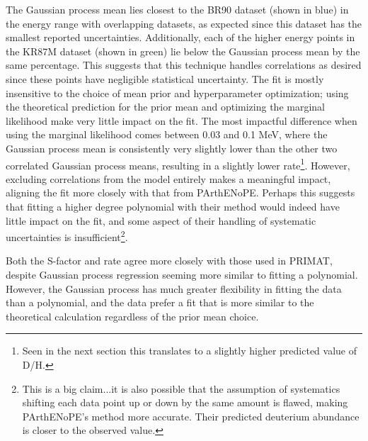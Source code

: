 \documentclass[%
 reprint,
superscriptaddress,
nofootinbib,
 amsmath,amssymb,
 aps,
 pra,
]{revtex4-2}
\begin{document}
The Gaussian process mean lies closest to the BR90 dataset \cite{Brown1990} (shown in blue) in the energy range with overlapping datasets, as expected since this dataset has the smallest reported uncertainties. Additionally, each of the higher energy points in the KR87M dataset \cite{Krauss1987} (shown in green) lie below the Gaussian process mean by the same percentage. This suggests that this technique handles correlations as desired since these points have negligible statistical uncertainty. The fit is mostly insensitive to the choice of mean prior and hyperparameter optimization; using the theoretical prediction for the prior mean and optimizing the marginal likelihood make very little impact on the fit. The most impactful difference when using the marginal likelihood comes between 0.03 and 0.1 MeV, where the Gaussian process mean is consistently very slightly lower than the other two correlated Gaussian process means, resulting in a slightly lower rate\footnote{Seen in the next section this translates to a slightly higher predicted value of D/H.}. However, excluding correlations from the model entirely makes a meaningful impact, aligning the fit more closely with that from PArthENoPE. Perhaps this suggests that fitting a higher degree polynomial with their method would indeed have little impact on the fit, and some aspect of their handling of systematic uncertainties is insufficient\footnote{This is a big claim...it is also possible that the assumption of systematics shifting each data point up or down by the same amount is flawed, making PArthENoPE's method more accurate. Their predicted deuterium abundance is closer to the observed value. \phantom{Some text to help with formatting}}. 

Both the S-factor and rate agree more closely with those used in PRIMAT, despite Gaussian process regression seeming more similar to fitting a polynomial. However, the Gaussian process has much greater flexibility in fitting the data than a polynomial, and the data prefer a fit that is more similar to the theoretical calculation regardless of the prior mean choice. 
\end{document}
